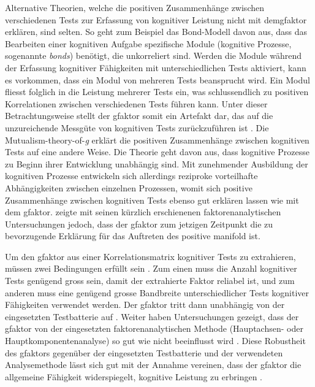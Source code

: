 \documentclass[11pt, twoside, a4paper]{book}		%
\begin{document}
Alternative Theorien, welche die positiven Zusammenhänge zwischen verschiedenen Tests zur Erfassung von kognitiver Leistung nicht mit dem\break\gls{gfaktor} erklären, sind selten. 
So geht zum Beispiel das Bond-Modell\break\citep{Thomson1916} davon aus, dass das Bearbeiten einer kognitiven Aufgabe spezifische Module (kognitive Prozesse, sogenannte \textit{bonds}) benötigt, die unkorreliert sind. Werden die Module während der Erfassung kognitiver Fähigkeiten mit unterschiedlichen Tests aktiviert, kann es vorkommen, dass ein Modul von mehreren Tests beansprucht wird. Ein Modul fliesst folglich in die Leistung mehrerer Tests ein, was schlussendlich zu positiven Korrelationen zwischen verschiedenen Tests führen kann. Unter dieser Betrachtungsweise stellt der \gls{gfaktor} somit ein Artefakt dar, das auf die unzureichende Messgüte von kognitiven Tests zurückzuführen ist \citep[für eine Gegenüberstellung zwischen dem \gls{gfaktor} und dem Bond-Modell siehe][]{Bartholomew2013}.
Die Mutualism-theory-of-\textit{g} \citep{VanDerMaas2006} erklärt die positiven Zusammenhänge zwischen kognitiven Tests auf eine andere Weise. Die Theorie geht davon aus, dass kognitive Prozesse zu Beginn ihrer Entwicklung unabhängig sind. Mit zunehmender Ausbildung der kognitiven Prozesse entwickeln sich allerdings reziproke vorteilhafte Abhängigkeiten zwischen einzelnen Prozessen, womit sich positive Zusammenhänge zwischen kognitiven Tests ebenso gut erklären lassen wie mit dem \gls{gfaktor}. \citet{Gignac2014, Gignac2016} zeigte mit seinen kürzlich erschienenen faktorenanalytischen Untersuchungen jedoch, dass der \gls{gfaktor} zum jetzigen Zeitpunkt die zu bevorzugende Erklärung für das Auftreten des positive manifold ist.

Um den \gls{gfaktor} aus einer Korrelationsmatrix kognitiver Tests zu extrahieren, müssen zwei Bedingungen erfüllt sein \citep[][S. 73]{Jensen1998a}. Zum einen muss die Anzahl kognitiver Tests genügend gross sein, damit der extrahierte Faktor reliabel ist, und zum anderen muss eine genügend grosse Bandbreite unterschiedlicher Tests kognitiver Fähigkeiten verwendet werden. Der \gls{gfaktor} tritt dann unabhängig von der eingesetzten Testbatterie auf \citep{Johnson2004, Johnson2008}. Weiter haben Untersuchungen gezeigt, dass der \gls{gfaktor} von der eingesetzten faktorenanalytischen Methode (Hauptachsen- oder Hauptkomponentenanalyse) so gut wie nicht beeinflusst wird \citep{Jensen1994, Ree1991}.
Diese Robustheit des \gls{gfaktor}s gegenüber der eingesetzten Testbatterie und der verwendeten Analysemethode lässt sich gut mit der Annahme vereinen, dass der \gls{gfaktor} die allgemeine Fähigkeit widerspiegelt, kognitive Leistung zu erbringen \citep{Spearman1904, Spearman1927}.
\end{document}
